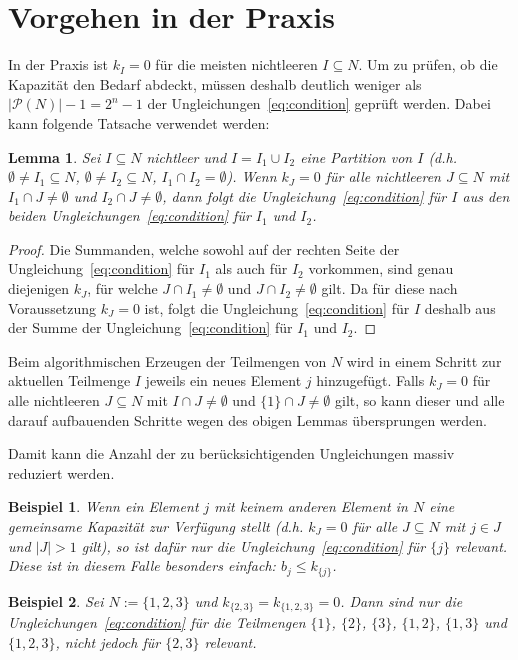 \documentclass{article}
\newtheorem{lemma}{Lemma}
\newtheorem{example}{Beispiel}
\newcommand{\powerset}{\ensuremath{\mathcal{P}}}
\begin{document}
	\section{Vorgehen in der Praxis}
	In der Praxis ist $k_I = 0$ für die meisten nichtleeren $I\subseteq N$. Um zu prüfen, ob die Kapazität den Bedarf abdeckt, müssen deshalb deutlich weniger als $\left|\powerset(N)\right| - 1 =  2^n - 1$ der Ungleichungen~\ref{eq:condition} geprüft werden. Dabei kann folgende Tatsache verwendet werden:
	\begin{lemma}
		Sei $I\subseteq N$ nichtleer und $I = I_1 \cup I_2$ eine Partition von $I$ (d.h. $\emptyset\neq I_1\subseteq N$, $\emptyset\neq I_2\subseteq N$, $I_1 \cap I_2 = \emptyset$).
		Wenn $k_J=0$ für alle nichtleeren $J\subseteq N$ mit $I_1 \cap J\neq \emptyset$ und $I_2 \cap J\neq \emptyset$, dann folgt die Ungleichung~\ref{eq:condition} für $I$ aus den beiden Ungleichungen~\ref{eq:condition} für $I_1$ und $I_2$.
	\end{lemma}
	\begin{proof}
		Die Summanden, welche sowohl auf der rechten Seite der Ungleichung~\ref{eq:condition} für $I_1$ als auch für $I_2$ vorkommen, sind genau diejenigen $k_J$, für welche $J\cap I_1\neq \emptyset$ und $J\cap I_2\neq \emptyset$ gilt. Da für diese nach Voraussetzung $k_J=0$ ist, folgt die Ungleichung~\ref{eq:condition} für $I$ deshalb aus der Summe der Ungleichung~\ref{eq:condition} für $I_1$ und $I_2$.
	\end{proof}

	Beim algorithmischen Erzeugen der Teilmengen von $N$ wird in einem Schritt zur aktuellen Teilmenge $I$ jeweils ein neues Element $j$ hinzugefügt. Falls $k_J = 0$ für alle nichtleeren $J\subseteq N$ mit $I\cap J\neq \emptyset$ und $\{1\}\cap J\neq \emptyset$  gilt, so kann dieser und alle darauf aufbauenden Schritte wegen des obigen Lemmas übersprungen werden.
	
	Damit kann die Anzahl der zu berücksichtigenden Ungleichungen massiv reduziert werden.

	\begin{example}
		Wenn ein Element $j$ mit keinem anderen Element in $N$ eine gemeinsame Kapazität zur Verfügung stellt (d.h. $k_J=0$ für alle $J\subseteq N$ mit $j\in J$ und $\left|J\right| > 1$ gilt), so ist dafür nur die Ungleichung~\ref{eq:condition} für $\{j\}$ relevant. Diese ist in diesem Falle besonders einfach: $b_j \leq k_{\{j\}}$.
	\end{example}
	
	\begin{example}
		Sei $N:=\{1, 2, 3\}$ und $k_{\{2, 3\}}=k_{\{1, 2, 3\}}=0$. Dann sind nur die Ungleichungen~\ref{eq:condition} für die Teilmengen ${\{1\}}$, ${\{2\}}$, ${\{3\}}$, ${\{1, 2\}}$, ${\{1, 3\}}$ und ${\{1, 2, 3\}}$, nicht jedoch für ${\{2, 3\}}$ relevant.
	\end{example}
	
\end{document}
